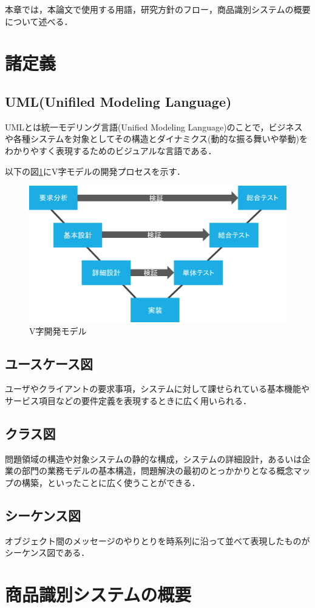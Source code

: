 

本章では，本論文で使用する用語，研究方針のフロー，商品識別システムの概要について述べる．

\section{諸定義}

\subsection*{UML(Unifiled Modeling Language)}

UMLとは統一モデリング言語(Unified Modeling Language)のことで，ビジネスや各種システムを対象としてその構造とダイナミクス(動的な振る舞いや挙動)をわかりやすく表現するためのビジュアルな言語\cite{uml}である．

以下の図\ref{vji}にV字モデルの開発プロセスを示す．

\begin{figure}[htbp]
\centering
\includegraphics[width=15cm]{./picture/vjimodel.eps}
\caption{V字開発モデル}
\label{vji}
\end{figure}

\subsection*{ユースケース図}

ユーザやクライアントの要求事項，システムに対して課せられている基本機能やサービス項目などの要件定義を表現するときに広く用いられる\cite{uml}．

\subsection*{クラス図}

問題領域の構造や対象システムの静的な構成，システムの詳細設計，あるいは企業の部門の業務モデルの基本構造，問題解決の最初のとっかかりとなる概念マップの構築，といったことに広く使\cite{uml}うことができる．

\subsection*{シーケンス図}

オブジェクト間のメッセージのやりとりを時系列に沿って並べて表現したもの\cite{uml}がシーケンス図である．


\section{商品識別システムの概要}